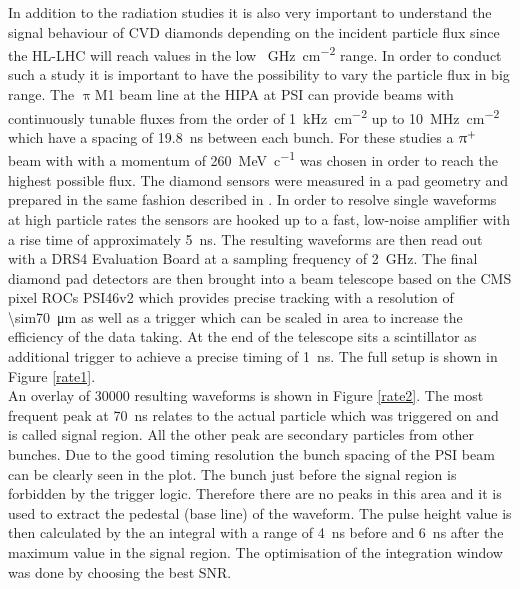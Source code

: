 In addition to the radiation studies it is also very important to understand the signal behaviour of \ac{CVD} diamonds depending on the incident particle flux since the \ac{HL-LHC} will reach values in the low \SI{}{\giga\hertz\per\centi\meter^2} range. In order to conduct such a study it is important to have the possibility to vary the particle flux in big range. The $\uppi$M1 beam line at the \ac{HIPA} at \ac{PSI} can provide beams with continuously tunable fluxes from the order of \SI{1}{\kilo\hertz\per\centi\meter^2} up to \SI{10}{\mega\hertz\per\centi\meter^2} which have a spacing of \SI{19.8}{\nano\second} between each bunch. For these studies a $\uppi^{\text{+}}$ beam with with a momentum of \SI{260}{\mega\electronvolt\per c} was chosen in order to reach the highest possible flux.
The diamond sensors were measured in a pad geometry and prepared in the same fashion described in \cite{rainer}. 
In order to resolve single waveforms at high particle rates the sensors are hooked up to a fast, low-noise amplifier with a rise time of approximately \SI{5}{\nano\second}. The resulting waveforms are then read out with a DRS4 Evaluation Board at a sampling frequency of \SI{2}{\giga\hertz}. The final diamond pad detectors are then brought into a beam telescope based on the CMS pixel \acp{ROC} PSI46v2 \cite{kornmayer} which provides precise tracking with a resolution of \SI{\sim70}{\micro\meter} as well as a trigger which can be scaled in area to increase the efficiency of the data taking. At the end of the telescope sits a scintillator as additional trigger to achieve a precise timing of \SI{1}{\nano\second}. The full setup is shown in Figure \vref{rate1}.\\
An overlay of 30000 resulting waveforms is shown in Figure \vref{rate2}. The most frequent peak at \SI{70}{\nano\second} relates to the actual particle which was triggered on and is called signal region. All the other peak are secondary particles from other bunches. Due to the good timing resolution the bunch spacing of the \ac{PSI} beam can be clearly seen in the plot. The bunch just before the signal region is forbidden by the trigger logic. Therefore there are no peaks in this area and it is used to extract the pedestal (base line) of the waveform. The pulse height value is then calculated by the an integral with a range of \SI{4}{\nano\second} before and \SI{6}{\nano\second} after the maximum value in the signal region. The optimisation of the integration window was done by choosing the best \ac{SNR}.\\

